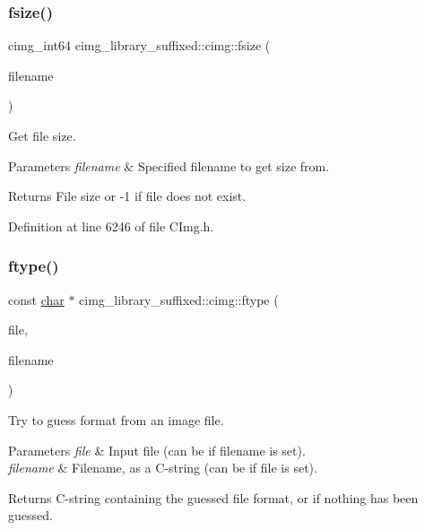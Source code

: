\subsubsection{\texorpdfstring{fsize()}{fsize()}}
{\footnotesize\ttfamily cimg\+\_\+int64 cimg\+\_\+library\+\_\+suffixed\+::cimg\+::fsize (\begin{DoxyParamCaption}\item[{const \hyperlink{classchar}{char} $\ast$const}]{filename }\end{DoxyParamCaption})\hspace{0.3cm}{\ttfamily [inline]}}



Get file size. 


\begin{DoxyParams}{Parameters}
{\em filename} & Specified filename to get size from. \\
\hline
\end{DoxyParams}
\begin{DoxyReturn}{Returns}
File size or \textquotesingle{}-\/1\textquotesingle{} if file does not exist. 
\end{DoxyReturn}


Definition at line 6246 of file C\+Img.\+h.

\mbox{\label{namespacecimg__library__suffixed_1_1cimg_a56c2dbfe99d9f6e6bc1be9d03b0ddaaa}} 
\subsubsection{\texorpdfstring{ftype()}{ftype()}}
{\footnotesize\ttfamily const \hyperlink{classchar}{char} $\ast$ cimg\+\_\+library\+\_\+suffixed\+::cimg\+::ftype (\begin{DoxyParamCaption}\item[{std\+::\+F\+I\+LE $\ast$const}]{file,  }\item[{const \hyperlink{classchar}{char} $\ast$const}]{filename }\end{DoxyParamCaption})\hspace{0.3cm}{\ttfamily [inline]}}



Try to guess format from an image file. 


\begin{DoxyParams}{Parameters}
{\em file} & Input file (can be {} if {\ttfamily filename} is set). \\
\hline
{\em filename} & Filename, as a C-\/string (can be {} if {\ttfamily file} is set). \\
\hline
\end{DoxyParams}
\begin{DoxyReturn}{Returns}
C-\/string containing the guessed file format, or {} if nothing has been guessed. 
\end{DoxyReturn}


